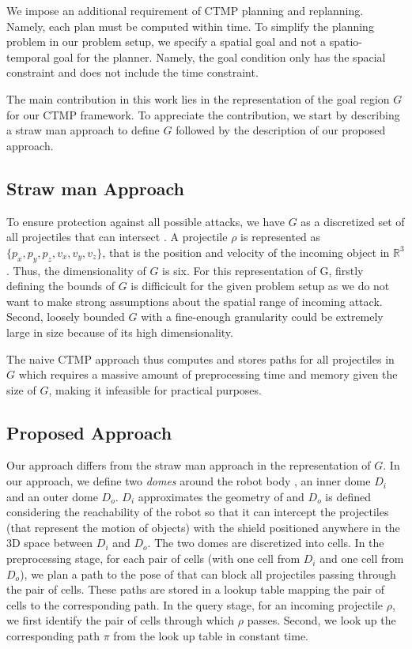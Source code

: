 \documentclass[a4paper]{report}
\begin{document}
We impose an additional requirement of CTMP planning and replanning. Namely, each plan must be computed within \Tbound time. To simplify the planning problem in our problem setup, we specify a spatial goal and not a spatio-temporal goal for the planner. Namely, the goal condition only has the spacial constraint and does not include the time constraint.

The main contribution in this work lies in the representation of the goal region $G$ for our CTMP framework. To appreciate the contribution, we start by describing a straw man approach to define $G$ followed by the description of our proposed approach.

\subsection{Straw man Approach}
To ensure protection against all possible attacks, we have $G$ as a discretized set of all projectiles that can intersect \calB. A projectile $\rho$ is represented as $\{p_x,p_y,p_z,v_x,v_y,v_z\}$, that is the  position and velocity of the incoming object in $\mathbb{R}^3$. Thus, the dimensionality of $G$ is six. For this representation of G, firstly defining the bounds of $G$ is difficicult for the given problem setup as we do not want to make strong assumptions about the spatial range of incoming attack. Second, loosely bounded $G$ with a fine-enough granularity could be extremely large in size because of its high dimensionality.

The naive CTMP approach thus computes and stores paths for all projectiles in $G$ which requires a massive amount of preprocessing time and memory given the size of $G$, making it infeasible for practical purposes.

\subsection{Proposed Approach}
Our approach differs from the straw man approach in the representation of $G$. In our approach, we define two \emph{domes} around the robot body \calB, an inner dome $D_i$ and an outer dome $D_o$. $D_i$ approximates the geometry of \calB and $D_o$ is defined considering the reachability of the robot so that it can intercept the projectiles (that represent the motion of objects) with the shield \calS positioned anywhere in the 3D space between $D_i$ and $D_o$. The two domes are discretized into cells. In the preprocessing stage, for each pair of cells (with one cell from $D_i$ and one cell from $D_o$), we plan a path to the pose of \calS that can block all projectiles passing through the pair of cells. These paths are stored in a lookup table mapping the pair of cells to the corresponding path. In the query stage, for an incoming projectile $\rho$, we first identify the pair of cells through which $\rho$ passes. Second, we look up the corresponding path $\pi$ from the look up table in constant time. 
\end{document}
